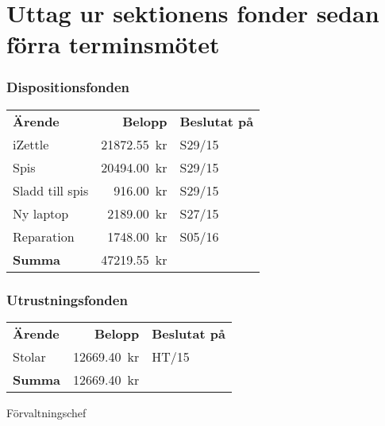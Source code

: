 \documentclass[../_main/handlingar.tex]{subfiles}
\begin{document}
\section{Uttag ur sektionens fonder sedan förra terminsmötet}

\subsubsection*{Dispositionsfonden}
\begin{tabular}{l r l}
    \textbf{Ärende} & \textbf{Belopp} & \textbf{Beslutat på} \\
    iZettle & \SI{21872.55}{kr} & S29/15 \\
    Spis & \SI{20494.00}{kr} & S29/15 \\
    Sladd till spis & \SI{916.00}{kr} & S29/15 \\
    Ny laptop & \SI{2189.00}{kr} & S27/15 \\
    Reparation & \SI{1748.00}{kr} & S05/16 \\
    \hline
    \textbf{Summa} & \SI{47219.55}{kr} \\
\end{tabular}

\subsubsection*{Utrustningsfonden}
\begin{tabular}{l r l}
    \textbf{Ärende} & \textbf{Belopp} & \textbf{Beslutat på} \\
    Stolar & \SI{12669.40}{kr} & HT/15 \\
    \hline
    \textbf{Summa} & \SI{12669.40}{kr} \\
\end{tabular}

\begin{signatures}{1}
    \ist
    \signature{Anders Nilsson}{Förvaltningschef}
\end{signatures}
\end{document}
